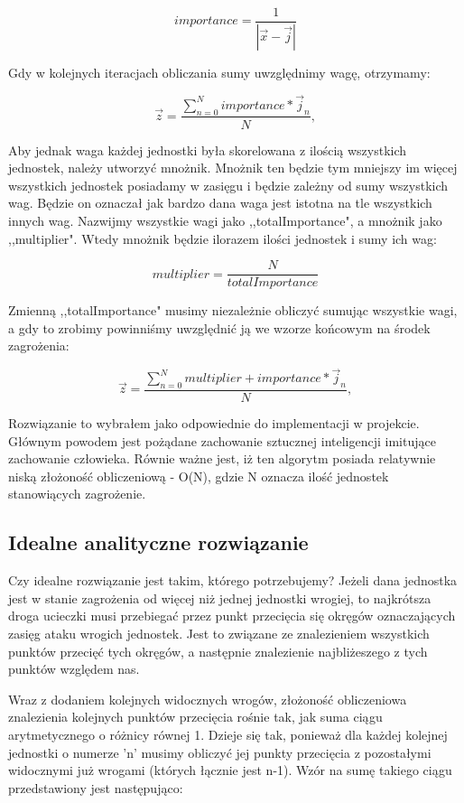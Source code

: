 \documentclass[12pt]{report}
\begin{document}
$$ importance = \dfrac{1}{|\vec x - \vec j|} $$

Gdy w kolejnych iteracjach obliczania sumy uwzględnimy wagę, otrzymamy:

$$\vec z = \dfrac{\sum_{n=0}^{N}  {importance * \vec j_n}}{N},   $$

Aby jednak waga każdej jednostki była skorelowana z ilością wszystkich jednostek, należy utworzyć mnożnik. Mnożnik ten będzie tym mniejszy im więcej wszystkich jednostek posiadamy w zasięgu i będzie zależny od sumy wszystkich wag. Będzie on oznaczał jak bardzo dana waga jest istotna na tle wszystkich innych wag. Nazwijmy wszystkie wagi jako ,,totalImportance", a mnożnik jako ,,multiplier". Wtedy mnożnik będzie ilorazem ilości jednostek i sumy ich wag:

$$ multiplier = \dfrac{N}{totalImportance} $$

Zmienną ,,totalImportance" musimy niezależnie obliczyć sumując wszystkie wagi, a gdy to zrobimy powinniśmy uwzględnić ją we wzorze końcowym na środek zagrożenia:

$$\vec z = \dfrac{\sum_{n=0}^{N}  {multiplier + importance * \vec j_n}}{N},   $$

Rozwiązanie to wybrałem jako odpowiednie do implementacji w projekcie. Głównym powodem jest pożądane zachowanie sztucznej inteligencji imitujące zachowanie człowieka. Równie ważne jest, iż ten algorytm posiada relatywnie niską złożoność obliczeniową - O(N), gdzie N oznacza ilość jednostek stanowiących zagrożenie.

\subsection{Idealne analityczne rozwiązanie}

Czy idealne rozwiązanie jest takim, którego potrzebujemy?
Jeżeli dana jednostka jest w stanie zagrożenia od więcej niż jednej jednostki wrogiej, to najkrótsza droga ucieczki musi przebiegać przez punkt przecięcia się okręgów oznaczających zasięg ataku wrogich jednostek. Jest to związane ze znalezieniem wszystkich punktów przecięć tych okręgów, a następnie znalezienie najbliżeszego z tych punktów względem nas.

Wraz z dodaniem kolejnych widocznych wrogów, złożoność obliczeniowa znalezienia kolejnych punktów przecięcia rośnie tak, jak suma ciągu arytmetycznego o różnicy równej 1. Dzieje się tak, ponieważ dla każdej kolejnej jednostki o numerze 'n' musimy obliczyć jej punkty przecięcia z pozostałymi widocznymi już wrogami (których łącznie jest n-1). Wzór na sumę takiego ciągu przedstawiony jest następująco: 
\end{document}
